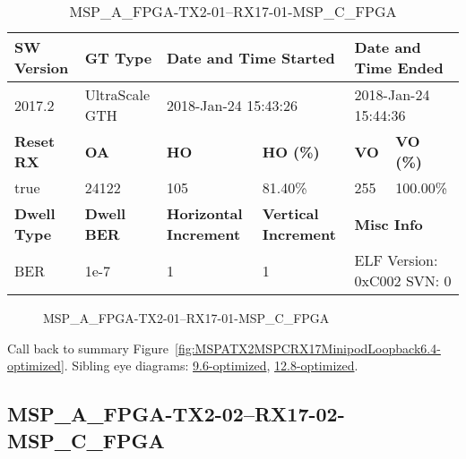 \begin{table}[h]
\centering
\caption{MSP\_A\_FPGA-TX2-01--RX17-01-MSP\_C\_FPGA}
\label{tab:MSPAFPGATX201RX1701MSPCFPGA6.4-optimized}
\begin{tabular}{@{}|l|l|l|l|l|l|@{}}
\toprule
\textbf{SW Version}                & \textbf{GT Type}   & \multicolumn{2}{l|}{\textbf{Date and Time Started}}            & \multicolumn{2}{l|}{\textbf{Date and Time Ended}}        \\ \midrule
2017.2                       & UltraScale GTH          & \multicolumn{2}{l|}{2018-Jan-24 15:43:26}                   & \multicolumn{2}{l|}{2018-Jan-24 15:44:36}               \\ \midrule
\textbf{Reset RX}                  & \textbf{OA} & \textbf{HO}   & \textbf{HO (\%)} & \textbf{VO} & \textbf{VO (\%)} \\ \midrule
true & 24122        & 105          & 81.40\%        & 255        & 100.00\%       \\ \midrule
\textbf{Dwell Type}                & \textbf{Dwell BER} & \textbf{Horizontal Increment} & \textbf{Vertical Increment}    & \multicolumn{2}{l|}{\textbf{Misc Info}}                  \\ \midrule
BER                            & 1e-7        & 1        & 1           & \multicolumn{2}{l|}{ELF Version: 0xC002 SVN: 0}                         \\ \bottomrule
\end{tabular}
\end{table}

\begin{figure}[h]
\caption{MSP\_A\_FPGA-TX2-01--RX17-01-MSP\_C\_FPGA} \label{fig:MSPAFPGATX201RX1701MSPCFPGA6.4-optimized}
\end{figure}

Call back to summary Figure~\ref{fig:MSPATX2MSPCRX17MinipodLoopback6.4-optimized}.
Sibling eye diagrams: \hyperref[sec:MSPAFPGATX201RX1701MSPCFPGA9.6-optimized]{9.6-optimized}, \hyperref[sec:MSPAFPGATX201RX1701MSPCFPGA12.8-optimized]{12.8-optimized}.

\clearpage
\newpage


\subsection{MSP\_A\_FPGA-TX2-02--RX17-02-MSP\_C\_FPGA}\label{sec:MSPAFPGATX202RX1702MSPCFPGA6.4-optimized}

